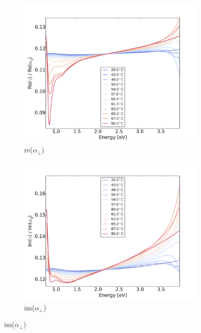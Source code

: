 %
\begin{figure}[h!]
    \centering
    \begin{subfigure}[b]{0.49\textwidth}
        \centering
        \includegraphics[width=\textwidth]{Results/Sim3/real_gammaDalpha.pdf}
        \caption{re($\alpha_{\perp}$)}
        \label{fig:2}
    \end{subfigure}
    \begin{subfigure}[b]{0.49\textwidth}
        \centering
        \includegraphics[width=\textwidth]{Results/Sim3/im_gammaDalpha.pdf}
        \caption{im($\alpha_{\perp}$)}
        \label{fig:2}

\end{subfigure}
\end{figure}
